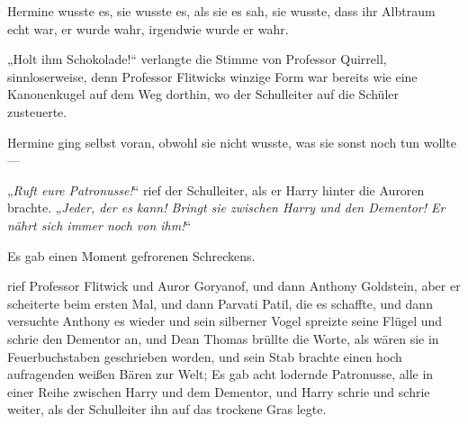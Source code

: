 Hermine wusste es, sie wusste es, als sie es sah, sie wusste, dass ihr Albtraum echt war, er wurde wahr, irgendwie wurde er wahr.

„Holt ihm Schokolade!“ verlangte die Stimme von Professor Quirrell, sinnloserweise, denn Professor Flitwicks winzige Form war bereits wie eine Kanonenkugel auf dem Weg dorthin, wo der Schulleiter auf die Schüler zusteuerte.

Hermine ging selbst voran, obwohl sie nicht wusste, was sie sonst noch tun wollte —

„\emph{Ruft eure Patronusse!}“ rief der Schulleiter, als er Harry hinter die Auroren brachte.
„\emph{Jeder, der es kann! Bringt sie zwischen Harry und den Dementor! Er nährt sich immer noch von ihm!}“

Es gab einen Moment gefrorenen Schreckens.

 rief Professor Flitwick und Auror Goryanof, und dann Anthony Goldstein, aber er scheiterte beim ersten Mal, und dann Parvati Patil, die es schaffte, und dann versuchte Anthony es wieder und sein silberner Vogel spreizte seine Flügel und schrie den Dementor an, und Dean Thomas brüllte die Worte, als wären sie in Feuerbuchstaben geschrieben worden, und sein Stab brachte einen hoch aufragenden weißen Bären zur Welt; Es gab acht lodernde Patronusse, alle in einer Reihe zwischen Harry und dem Dementor, und Harry schrie und schrie weiter, als der Schulleiter ihn auf das trockene Gras legte.

